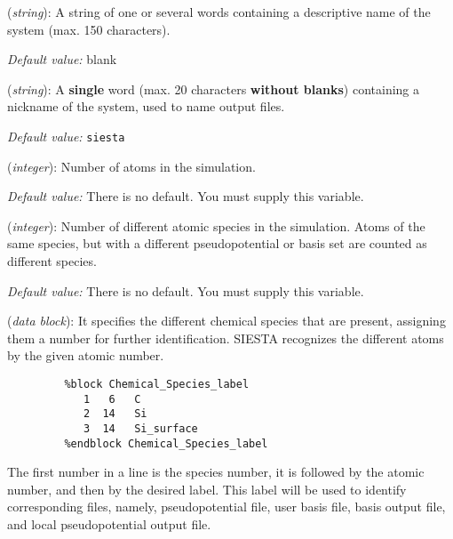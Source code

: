 \begin{description}
\itemsep 10pt
\parsep 0pt

\item[{\bf SystemName}] ({\it string}): 
A string of one or several words containing a descriptive
name of the system (max. 150 characters). 

{\it Default value:} blank

\item[{\bf SystemLabel}] ({\it string}): 
A {\bf single} word (max. 20 characters {\bf without blanks})
containing a nickname of the system, used to name output files.

{\it Default value:} {\tt siesta}

\item[{\bf NumberOfAtoms}] ({\it integer}): 
Number of atoms in the simulation.

{\it Default value:} There is no default. You must supply this variable.


\item[{\bf NumberOfSpecies}] ({\it integer}): 
Number of different atomic species in the simulation. 
Atoms of the same species, but with a different 
pseudopotential or basis set are counted as different species.

{\it Default value:} There is no default. You must supply this variable.


\item[{\bf ChemicalSpeciesLabel}] ({\it data block}): 
It specifies the different chemical species that are present, 
assigning them a number for further identification. 
SIESTA recognizes the different atoms by the given atomic number.

\begin{verbatim}
         %block Chemical_Species_label
            1   6   C 
            2  14   Si
            3  14   Si_surface
         %endblock Chemical_Species_label
\end{verbatim}

The first number in a line is the species number, it is followed by the
atomic number, and then by the desired label. This label will be used
to identify corresponding files, namely, pseudopotential file, user basis
file, basis output file, and local pseudopotential output file.


\end{description}
